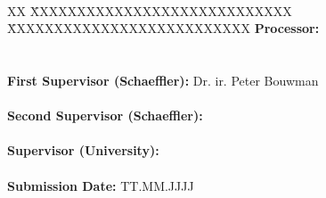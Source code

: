 {\centering

\large{\arbeit} \\[6pt]	
\Large{\titel}

\par}

\vfill

{\raggedright
\begin{tabbing}
XX \= XXXXXXXXXXXXXXXXXXXXXXXXXXXX \= XXXXXXXXXXXXXXXXXXXXXXXXXX \kill
		\> \textbf{Processor:} 	\> \autor \\[6pt]
		\>								\\
 		\>												\>									\\
		\> \textbf{First Supervisor (Schaeffler):}		\> Dr. ir. Peter Bouwman \\
		\>												\>									\\
		\> \textbf{Second Supervisor (Schaeffler):}		\> \betreuer \\
		\>												\>									\\
		\> \textbf{Supervisor (University):}		\> \gutachter \\
		\>												\>									\\
		\> \textbf{Submission Date:}	\> TT.MM.JJJJ															
\end{tabbing}
\par}
\restoregeometry
\cleardoublepage